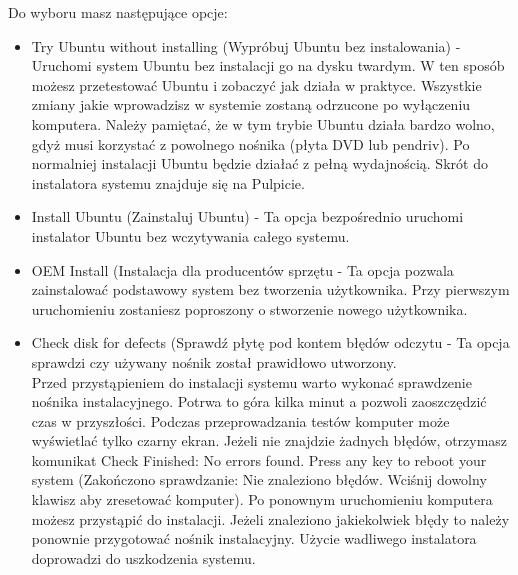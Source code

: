 \noindent Do wyboru masz następujące opcje:
\begin{itemize}
\item \textcolor{ubuntu_orange}{Try Ubuntu without installing (Wypróbuj Ubuntu bez instalowania)} - Uruchomi system Ubuntu bez instalacji go na dysku twardym. W ten sposób możesz przetestować Ubuntu i zobaczyć jak działa w praktyce. Wszystkie zmiany jakie wprowadzisz w systemie zostaną odrzucone po wyłączeniu komputera. Należy pamiętać, że w tym trybie Ubuntu działa bardzo wolno, gdyż musi korzystać z powolnego nośnika (płyta DVD lub pendriv). Po normalniej instalacji Ubuntu będzie działać z pełną wydajnością. Skrót do instalatora systemu znajduje się na Pulpicie.
\item \textcolor{ubuntu_orange}{Install Ubuntu (Zainstaluj Ubuntu)} - Ta opcja bezpośrednio uruchomi instalator Ubuntu bez wczytywania całego systemu.
\item \textcolor{ubuntu_orange}{OEM Install (Instalacja dla producentów sprzętu} - Ta opcja pozwala zainstalować podstawowy system bez tworzenia użytkownika. Przy pierwszym uruchomieniu zostaniesz poproszony o stworzenie nowego użytkownika.
\item \textcolor{ubuntu_orange}{Check disk for defects (Sprawdź płytę pod kontem błędów odczytu} - Ta opcja sprawdzi czy używany nośnik został prawidłowo utworzony.\\
Przed przystąpieniem do instalacji systemu warto wykonać sprawdzenie nośnika instalacyjnego. Potrwa to góra kilka minut a pozwoli zaoszczędzić czas w przyszłości. Podczas przeprowadzania testów komputer może wyświetlać tylko czarny ekran. Jeżeli nie znajdzie żadnych błędów, otrzymasz komunikat \textcolor{ubuntu_orange}{Check Finished: No errors found. Press any key to reboot your system (Zakończono sprawdzanie: Nie znaleziono błędów. Wciśnij dowolny klawisz aby zresetować komputer)}. Po ponownym uruchomieniu komputera możesz przystąpić do instalacji. Jeżeli znaleziono jakiekolwiek błędy to należy ponownie przygotować nośnik instalacyjny. Użycie wadliwego instalatora doprowadzi do uszkodzenia systemu. 
\end{itemize}
\clearpage
